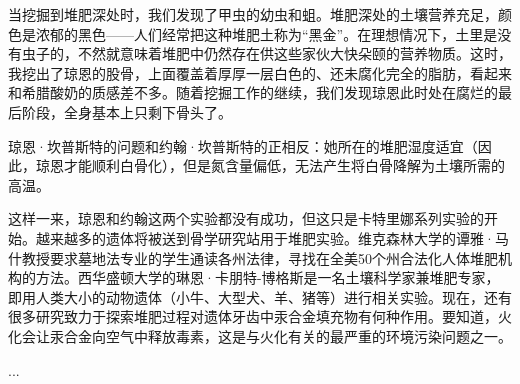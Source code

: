 \documentclass[12pt,oneside]{book}
\begin{document}
\begin{bookref}[frametitle={\cite{好好告别}}]
当挖掘到堆肥深处时，我们发现了甲虫的幼虫和蛆。堆肥深处的土壤营养充足，颜色是浓郁的黑色——人们经常把这种堆肥土称为“黑金”。在理想情况下，土里是没有虫子的，不然就意味着堆肥中仍然存在供这些家伙大快朵颐的营养物质。这时，我挖出了琼恩的股骨，上面覆盖着厚厚一层白色的、还未腐化完全的脂肪，看起来和希腊酸奶的质感差不多。随着挖掘工作的继续，我们发现琼恩此时处在腐烂的最后阶段，全身基本上只剩下骨头了。

琼恩·坎普斯特的问题和约翰·坎普斯特的正相反：她所在的堆肥湿度适宜（因此，琼恩才能顺利白骨化），但是氮含量偏低，无法产生将白骨降解为土壤所需的高温。

这样一来，琼恩和约翰这两个实验都没有成功，但这只是卡特里娜系列实验的开始。越来越多的遗体将被送到骨学研究站用于堆肥实验。维克森林大学的谭雅·马什教授要求墓地法专业的学生通读各州法律，寻找在全美50个州合法化人体堆肥机构的方法。西华盛顿大学的琳恩·卡朋特-博格斯是一名土壤科学家兼堆肥专家，即用人类大小的动物遗体（小牛、大型犬、羊、猪等）进行相关实验。现在，还有很多研究致力于探索堆肥过程对遗体牙齿中汞合金填充物有何种作用。要知道，火化会让汞合金向空气中释放毒素，这是与火化有关的最严重的环境污染问题之一。

...

\end{bookref}
\end{document}
